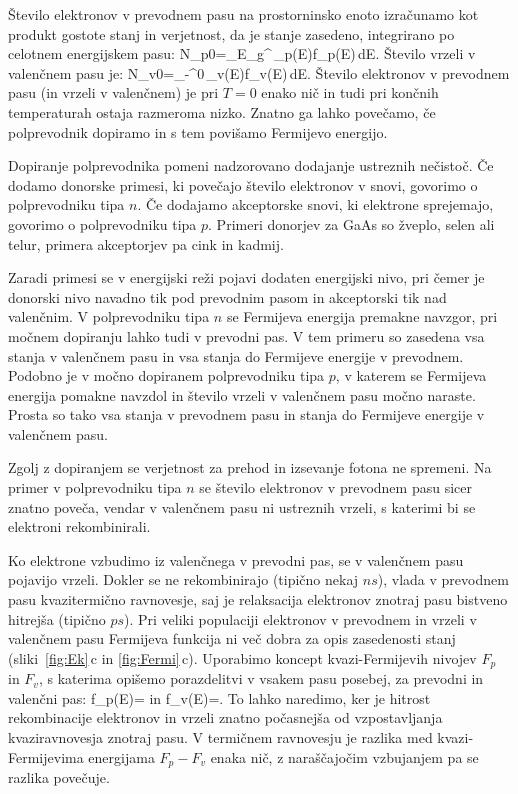 Število elektronov v prevodnem pasu na prostorninsko enoto izračunamo kot 
produkt gostote stanj in verjetnost, da je stanje zasedeno, integrirano po 
celotnem energijskem pasu:
\beq
N_{p0}=\int_{E_g}^{\infty}\,\rho_p(E)f_p(E)\,dE.
\label{6.3a}
\eeq
Število vrzeli v valenčnem pasu je: 
\beq
N_{v0}=\int_{-\infty}^{0}\,\rho_v(E)f_v(E)\,dE.
\label{6.3b}
\eeq
Število elektronov v prevodnem pasu (in vrzeli v valenčnem) je pri
$T=0$ enako nič in tudi pri končnih temperaturah ostaja razmeroma nizko. 
Znatno ga lahko povečamo, če polprevodnik dopiramo in s tem povišamo 
Fermijevo energijo.

Dopiranje polprevodnika pomeni nadzorovano dodajanje ustreznih nečistoč. 
Če dodamo donorske primesi, ki povečajo število elektronov v snovi, 
govorimo o polprevodniku tipa $n$. Če dodajamo akceptorske snovi, ki 
elektrone sprejemajo, govorimo o polprevodniku tipa $p$. 
Primeri donorjev za GaAs so žveplo, selen ali telur,
primera akceptorjev pa cink in kadmij. 

Zaradi primesi se v energijski 
reži pojavi dodaten energijski nivo, pri čemer je donorski nivo navadno 
tik pod prevodnim pasom in akceptorski tik nad valenčnim. V polprevodniku tipa $n$ se
Fermijeva energija premakne navzgor, pri močnem dopiranju lahko tudi v 
prevodni pas. V tem primeru so zasedena vsa stanja v valenčnem pasu in vsa
stanja do Fermijeve energije v prevodnem. Podobno je v močno dopiranem polprevodniku tipa 
$p$, v katerem se Fermijeva energija pomakne navzdol in število vrzeli v valenčnem 
pasu močno naraste. Prosta so tako vsa stanja v prevodnem pasu in stanja do 
Fermijeve energije v valenčnem pasu.

\begin{remark}
 Zgolj z dopiranjem se verjetnost za prehod in izsevanje fotona ne spremeni. 
 Na primer v polprevodniku tipa $n$ se število 
 elektronov v prevodnem pasu sicer znatno poveča, 
 vendar v valenčnem pasu ni ustreznih vrzeli, s katerimi bi se elektroni rekombinirali.
\end{remark}

Ko elektrone vzbudimo iz valenčnega v prevodni pas, se v valenčnem pasu pojavijo
vrzeli. Dokler se ne rekombinirajo (tipično nekaj $\si{ns}$),
vlada v prevodnem pasu kvazitermično ravnovesje, saj je relaksacija 
elektronov znotraj pasu bistveno hitrejša (tipično $\si{ps}$). 
Pri veliki populaciji elektronov v prevodnem in vrzeli v 
valenčnem pasu Fermijeva funkcija ni več dobra za opis zasedenosti stanj 
(sliki~\ref{fig:Ek}\,c in \ref{fig:Fermi}\,c). Uporabimo 
koncept kvazi-Fermijevih nivojev $F_p$ in $F_v$, s katerima opišemo porazdelitvi
v vsakem pasu posebej, za prevodni in valenčni pas:
\beq
f_p(E)=
\eeq
in 
\beq
f_v(E)=.
\eeq
To lahko naredimo, ker je hitrost rekombinacije elektronov in vrzeli znatno počasnejša
od vzpostavljanja kvaziravnovesja znotraj pasu. V termičnem ravnovesju je razlika med 
kvazi-Fermijevima energijama $F_{p}-F_v$ enaka nič, z naraščajočim vzbujanjem pa se 
razlika povečuje.


